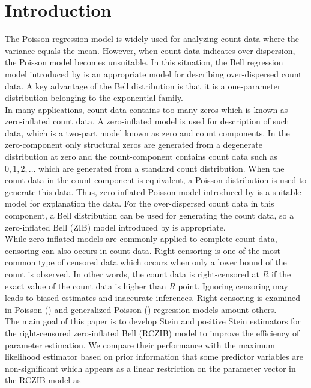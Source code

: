 \documentclass[twoside]{article}
\begin{document}
\section{Introduction}
The Poisson regression model is widely used for analyzing count data where the variance equals the mean. However, when count data indicates over-dispersion, the Poisson model becomes unsuitable. In this situation, the Bell regression model introduced by \cite{Castellares:et:al:2018} is an appropriate model for describing over-dispersed count data. A key advantage of the Bell distribution is that it is a one-parameter distribution belonging to the exponential family.
\\
In many applications, count data contains too many zeros which is known as zero-inflated count data. A zero-inflated model is used for description of such data, which is a two-part model known as zero and count components. In the zero-component only structural zeros are generated from a degenerate distribution at zero and the count-component contains count data such as 
$ 0,1,2, \dots $
which are generated from a standard count distribution. When the count data in the count-component is equivalent, a Poisson distribution is used to generate this data. Thus, zero-inflated Poisson model introduced by \cite{Lambert:1992} is a suitable model for explanation the data. For the over-dispersed count data in this component, a Bell distribution can be used for generating the count data, so a zero-inflated Bell (ZIB) model introduced by \cite{Lemonte:et:al:2020} is appropriate. 
\\
While zero-inflated models are commonly applied to complete count data, censoring can also occurs in count data. Right-censoring is one of the most common type of censored data which occurs when only a lower bound of the count is observed. In other words, the count data is right-censored at $ R $ if the exact value of the count data is higher than $ R $ point. Ignoring censoring may leads to biased estimates and inaccurate inferences. Right-censoring is examined in Poisson (\cite{Terza:1985}) and generalized Poisson (\cite{Famoye:Wang:2004}) regression models amount others. 
\\
The main goal of this paper is to develop Stein and positive Stein estimators for the right-censored zero-inflated Bell (RCZIB) model to improve the efficiency of parameter estimation. We compare their performance with the maximum likelihood estimator based on prior information that some predictor variables are non-significant which appears as a linear restriction on the parameter vector in the RCZIB model as
\end{document}

